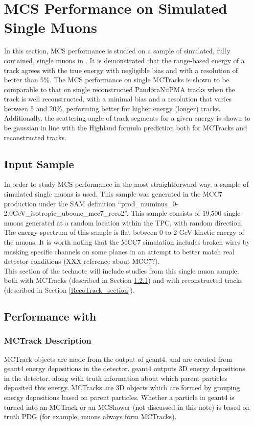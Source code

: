 \section{MCS Performance on Simulated Single Muons}\label{singlemuon_MC_section}
In this section, MCS performance is studied on a sample of simulated, fully contained, single muons in {\ub}. It is demonstrated that the range-based energy of a track agrees with the true energy with negligible bias and with a resolution of better than 5\%. The MCS performance on single {\sc MCTracks} is shown to be comparable to that on single reconstructed PandoraNuPMA tracks when the track is well reconstructed, with a minimal bias and a resolution that varies between 5 and 20\%, performing better for higher energy (longer) tracks. Additionally, the scattering angle of track segments for a given energy is shown to be gaussian in line with the Highland formula prediction both for {\sc MCTracks} and reconstructed tracks.


\subsection{Input Sample}\label{SingleMu_Input_Sample_section}
In order to study MCS performance in the most straightforward way, a sample of simulated single muons is used. This sample was generated in the {\ub} MCC7 production under the SAM definition ``prod\_muminus\_0-2.0GeV\_isotropic\_uboone\_mcc7\_reco2''. This sample consists of 19,500 single muons generated at a random location within the {\ub} TPC, with random direction. The energy spectrum of this sample is flat between 0 to 2 GeV kinetic energy of the muons. It is worth noting that the MCC7 simulation includes broken wires by masking specific channels on some planes in an attempt to better match real detector conditions (XXX reference about MCC7?).\\

This section of the technote will include studies from this single muon sample, both with {\sc MCTracks} (described in Section \ref{MCTrack_section}) and with reconstructed tracks (described in Section \ref{RecoTrack_section}).

\subsection{Performance with }
\subsubsection{MCTrack Description}\label{MCTrack_section}
{\sc MCTrack} objects are made from the output of {\sc geant}4, and are created from {\sc geant}4 energy depositions in the detector. {\sc geant}4 outputs 3D energy depositions in the detector, along with truth information about which parent particles deposited this energy. {\sc MCTracks} are 3D objects which are formed by grouping energy depositions based on parent particles. Whether a particle in {\sc geant}4 is turned into an {\sc MCTrack} or an {\sc MCShower} (not discussed in this note) is based on truth PDG (for example, muons always form {\sc MCTracks}).\\

